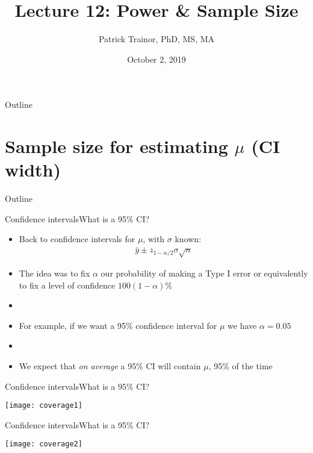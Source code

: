 \documentclass[xcolor=dvipsnames]{beamer}
\title[Lecture 12]{Lecture 12: Power \& Sample Size}
\author[Patrick Trainor]{Patrick Trainor, PhD, MS, MA}
\institute[NMSU]{New Mexico State University}
\date{October 2, 2019}
\begin{document}
\begin{frame}
\maketitle
\end{frame}

\begin{frame}{Outline}
\tableofcontents[hideallsubsections]
\end{frame}

\section{Sample size for estimating $\mu$ (CI width)}

\begin{frame}{Outline}
\tableofcontents[currentsection,subsectionstyle=show/shaded/hide]
\end{frame}

\begin{frame}{Confidence intervals}{What is a 95\% CI?}
\begin{itemize}
	\item Back to confidence intervals for $\mu$, with $\sigma$ known:
	\begin{gather*}
		\bar{y}\pm z_{1-\alpha/2} \sigma \sqrt{n}
	\end{gather*}
	\item The idea was to fix $\alpha$ our probability of making a Type I error or equivalently to fix a level of confidence $100(1-\alpha)\%$
	\item[]
	\item For example, if we want a 95\% confidence interval for $\mu$ we have $\alpha = 0.05$
	\item[]
	\item We expect that \emph{on average} a 95\% CI will contain $\mu$,  95\% of the time
\end{itemize}
\end{frame}

\begin{frame}{Confidence intervals}{What is a 95\% CI?}
	\begin{center}
		\texttt{[image: coverage1]}
	\end{center}
\end{frame}

\begin{frame}{Confidence intervals}{What is a 95\% CI?}
\begin{center}
	\texttt{[image: coverage2]}
\end{center}
\end{frame}
\end{document}
